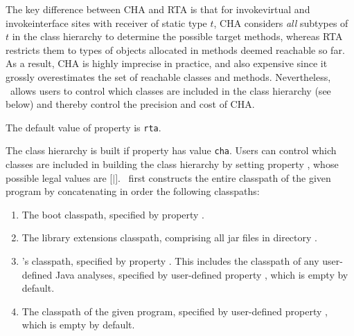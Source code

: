 \begin{itemize}
\begin{itemize}
The key difference between CHA and RTA is that for invokevirtual and invokeinterface sites with receiver of
static type $t$, CHA considers {\it all} subtypes of $t$ in the class hierarchy to determine the possible
target methods, whereas RTA restricts them to types of objects allocated in methods deemed reachable so far.
As a result, CHA is highly imprecise in practice, and also expensive since it grossly overestimates the set
of reachable classes and methods.
Nevertheless, \Chord\ allows users to control which classes are included in the class hierarchy (see below)
and thereby control the precision and cost of CHA.

\end{itemize}
The default value of property  is {\tt rta}.
\end{itemize}

The class hierarchy is built if property  has value {\tt cha}.
Users can control which classes are included in building the class hierarchy by setting property ,
whose possible legal values are [$|$].
\Chord\ first constructs the entire classpath of the given program by concatenating in order the following
classpaths:

\begin{enumerate}
\item
The boot classpath, specified by property .
\item
The library extensions classpath, comprising all jar files in directory .
\item
\Chord's classpath, specified by property .
This includes the classpath of any user-defined Java analyses, specified by user-defined property , which is empty by default.
\item
The classpath of the given program, specified by user-defined property , which is empty by default.
\end{enumerate}


